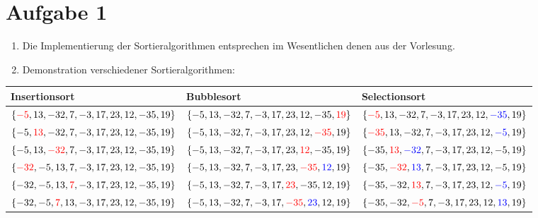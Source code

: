 \section*{Aufgabe 1}
\begin{enumerate}[nolistsep, label=\alph*)]
	\item Die Implementierung der Sortieralgorithmen entsprechen im Wesentlichen denen aus der Vorlesung. 
	\item Demonstration verschiedener Sortieralgorithmen: 
\end{enumerate}

\newcommand{\arrayfontsize}{\fontsize{3mm}{3.5mm}}
\begin{longtable}{*{3}{|p{0.31\textwidth}}|}
	\hline
	\textbf{Insertionsort} & \textbf{Bubblesort} & \textbf{Selectionsort} \\
    \hline
    \endhead
    \arrayfontsize $\{\textcolor{red}{-5}, 13, -32, 7, -3, 17, 23, 12, -35, 19\}$ & \arrayfontsize $\{-5, 13, -32, 7, -3, 17, 23, 12, -35, \textcolor{red}{19}\}$ & \arrayfontsize $\{\textcolor{red}{-5}, 13, -32, 7, -3, 17, 23, 12, \textcolor{blue}{-35}, 19\}$ \\
\hline
\arrayfontsize $\{-5, \textcolor{red}{13}, -32, 7, -3, 17, 23, 12, -35, 19\}$ & \arrayfontsize $\{-5, 13, -32, 7, -3, 17, 23, 12, \textcolor{red}{-35}, 19\}$ & \arrayfontsize $\{\textcolor{red}{-35}, 13, -32, 7, -3, 17, 23, 12, \textcolor{blue}{-5}, 19\}$ \\
\hline
\arrayfontsize $\{-5, 13, \textcolor{red}{-32}, 7, -3, 17, 23, 12, -35, 19\}$ & \arrayfontsize $\{-5, 13, -32, 7, -3, 17, 23, \textcolor{red}{12}, -35, 19\}$ & \arrayfontsize $\{-35, \textcolor{red}{13}, \textcolor{blue}{-32}, 7, -3, 17, 23, 12, -5, 19\}$ \\
\hline
\arrayfontsize $\{\textcolor{red}{-32}, -5, 13, 7, -3, 17, 23, 12, -35, 19\}$ & \arrayfontsize $\{-5, 13, -32, 7, -3, 17, 23, \textcolor{red}{-35}, \textcolor{blue}{12}, 19\}$ & \arrayfontsize $\{-35, \textcolor{red}{-32}, \textcolor{blue}{13}, 7, -3, 17, 23, 12, -5, 19\}$ \\
\hline
\arrayfontsize $\{-32, -5, 13, \textcolor{red}{7}, -3, 17, 23, 12, -35, 19\}$ & \arrayfontsize $\{-5, 13, -32, 7, -3, 17, \textcolor{red}{23}, -35, 12, 19\}$ & \arrayfontsize $\{-35, -32, \textcolor{red}{13}, 7, -3, 17, 23, 12, \textcolor{blue}{-5}, 19\}$ \\
\hline
\arrayfontsize $\{-32, -5, \textcolor{red}{7}, 13, -3, 17, 23, 12, -35, 19\}$ & \arrayfontsize $\{-5, 13, -32, 7, -3, 17, \textcolor{red}{-35}, \textcolor{blue}{23}, 12, 19\}$ & \arrayfontsize $\{-35, -32, \textcolor{red}{-5}, 7, -3, 17, 23, 12, \textcolor{blue}{13}, 19\}$ \\

\end{longtable}
